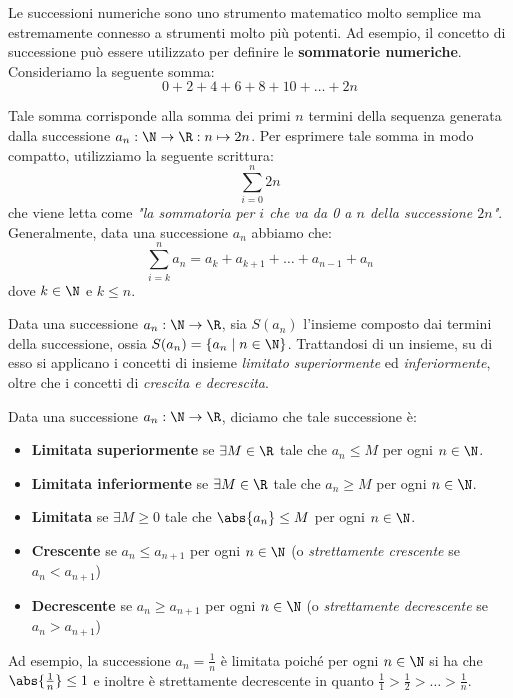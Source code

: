 \documentclass[a4paper, 12pt]{report}
\begin{document}
    Le successioni numeriche sono uno strumento matematico molto semplice ma estremamente connesso a strumenti molto più potenti. Ad esempio, il concetto di successione può essere utilizzato per definire le \textbf{sommatorie numeriche}. Consideriamo la seguente somma:
    \[0 + 2 + 4 + 6 + 8 + 10 + \ldots + 2n\]

    Tale somma corrisponde alla somma dei primi $n$ termini della sequenza generata dalla successione $a_n : \N \to \R : n \mapsto 2n$. Per esprimere tale somma in modo compatto, utilizziamo la seguente scrittura:
    \[\sum_{i = 0}^n 2n\]
    che viene letta come \textit{"la sommatoria per $i$ che va da 0 a $n$ della successione $2n$"}. Generalmente, data una successione $a_n$ abbiamo che:
    \[\sum_{i = k}^n a_n = a_k + a_{k+1} + \ldots + a_{n-1} + a_n\]
    dove $k \in \N$ e $k \leq n$.

    Data una successione $a_n : \N \to \R$, sia $S(a_n)$ l'insieme composto dai termini della successione, ossia $S(a_n) = \{a_n \mid n \in \N\}$. Trattandosi di un insieme, su di esso si applicano i concetti di insieme \textit{limitato superiormente} ed \textit{inferiormente}, oltre che i concetti di \textit{crescita e decrescita}.

    Data una successione $a_n : \N \to \R$, diciamo che tale successione è:
    \begin{itemize}
        \item \textbf{Limitata superiormente} se $\exists M \in \R$ tale che $a_n \leq M$ per ogni $n \in \N$. 
        \item \textbf{Limitata inferiormente} se $\exists M \in \R$ tale che $a_n \geq M$ per ogni $n \in \N$. 
        \item \textbf{Limitata} se $\exists M \geq 0$ tale che $\abs{a_n} \leq M$ per ogni $n \in \N$. 
        \item \textbf{Crescente} se $a_n \leq a_{n+1}$ per ogni $n \in \N$ (o \textit{strettamente crescente} se $a_n < a_{n+1}$)
        \item \textbf{Decrescente} se $a_n \geq a_{n+1}$ per ogni $n \in \N$ (o \textit{strettamente decrescente} se $a_n > a_{n+1}$)
        
    \end{itemize}
    
    Ad esempio, la successione $a_n = \frac{1}{n}$ è limitata poiché per ogni $n \in \N$ si ha che $\abs{\frac{1}{n}} \leq 1$ e inoltre è strettamente decrescente in quanto $\frac{1}{1} > \frac{1}{2} > \ldots > \frac{1}{n}$. 
\end{document}
